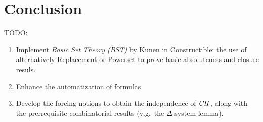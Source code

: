\section{Conclusion}

TODO:
\begin{enumerate}
\item Implement \emph{Basic Set Theory (BST)} by Kunen in
  Constructible: the use of alternatively Replacement or Powerset to
  prove basic absoluteness and closure resuls.
\item Enhance the automatization of formulas
\item Develop the forcing notions to obtain the independence of $\mathit{CH}$,
  along with the prerrequisite combinatorial results (v.g.\ the
  $\Delta$-system lemma).
\end{enumerate}

